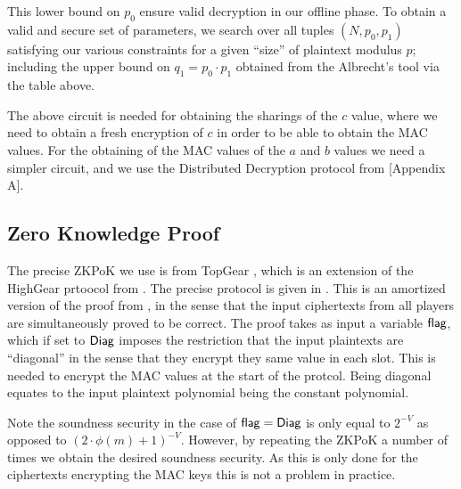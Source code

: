 This lower bound on $p_0$ ensure valid decryption in our offline phase.
To obtain a valid and secure set of parameters, we search over
all tuples $(N,p_0,p_1)$ satisfying our various constraints for
a given ``size'' of plaintext modulus $p$; including the upper bound
on $q_1=p_0 \cdot p_1$ obtained from the Albrecht's tool via 
the table above.

The above circuit is needed for obtaining the sharings of the $c$
value, where we need to obtain a fresh encryption of $c$ in order
to be able to obtain the MAC values.
For the obtaining of the MAC values of the $a$ and $b$ values
we need a simpler circuit, and we use the Distributed Decryption
protocol from \cite{KPR}[Appendix A].

\subsection{Zero Knowledge Proof}
The precise ZKPoK we use is from TopGear \cite{TopGear}, which
is an extension of the HighGear prtoocol from \cite{KPR}.
The precise protocol is given in .
This is an amortized version of the proof from \cite{SPDZ}, in the sense
that the input ciphertexts from all players are simultaneously proved to be
correct.
The proof takes as input a variable $\mathsf{flag}$, which if set to $\mathsf{Diag}$
imposes the restriction that the input plaintexts are ``diagonal'' in
the sense that they encrypt they same value in each slot.
This is needed to encrypt the MAC values at the start of the protcol.
Being diagonal equates to the input plaintext polynomial being the constant
polynomial.



Note the soundness security in the case of $\mathsf{flag}=\mathsf{Diag}$ is only
equal to $2^{-V}$ as opposed to $(2 \cdot \phi(m)+1)^{-V}$.
However, by repeating the ZKPoK a number of times we obtain
the desired soundness security. As this is only done for
the ciphertexts encrypting the MAC keys this is not a problem in
practice.

